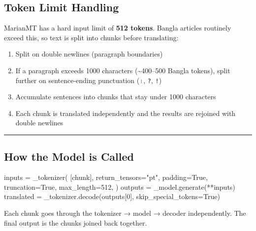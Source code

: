 \documentclass[
]{article}
\newenvironment{Shaded}{}{}
\newcommand{\DecValTok}[1]{\textcolor[rgb]{0.25,0.63,0.44}{#1}}
\newcommand{\NormalTok}[1]{#1}
\newcommand{\OperatorTok}[1]{\textcolor[rgb]{0.40,0.40,0.40}{#1}}
\newcommand{\StringTok}[1]{\textcolor[rgb]{0.25,0.44,0.63}{#1}}
\newcommand{\VariableTok}[1]{\textcolor[rgb]{0.10,0.09,0.49}{#1}}
\providecommand{\tightlist}{%
  \setlength{\itemsep}{0pt}\setlength{\parskip}{0pt}}
\begin{document}
\subsection{Token Limit Handling}\label{token-limit-handling}

MarianMT has a hard input limit of \textbf{512 tokens}. Bangla articles
routinely exceed this, so text is split into chunks before translating:

\begin{enumerate}
\def\labelenumi{\arabic{enumi}.}
\tightlist
\item
  Split on double newlines (paragraph boundaries)
\item
  If a paragraph exceeds 1000 characters (\textasciitilde400--500 Bangla
  tokens), split further on sentence-ending punctuation (\texttt{।},
  \texttt{?}, \texttt{!})
\item
  Accumulate sentences into chunks that stay under 1000 characters
\item
  Each chunk is translated independently and the results are rejoined
  with double newlines
\end{enumerate}

\begin{center}\rule{0.5\linewidth}{0.5pt}\end{center}

\subsection{How the Model is Called}\label{how-the-model-is-called}

\begin{Shaded}
\begin{Highlighting}[]
\NormalTok{inputs }\OperatorTok{=}\NormalTok{ \_tokenizer(}
\NormalTok{    [chunk],}
\NormalTok{    return\_tensors}\OperatorTok{=}\StringTok{"pt"}\NormalTok{,}
\NormalTok{    padding}\OperatorTok{=}\VariableTok{True}\NormalTok{,}
\NormalTok{    truncation}\OperatorTok{=}\VariableTok{True}\NormalTok{,}
\NormalTok{    max\_length}\OperatorTok{=}\DecValTok{512}\NormalTok{,}
\NormalTok{)}
\NormalTok{outputs }\OperatorTok{=}\NormalTok{ \_model.generate(}\OperatorTok{**}\NormalTok{inputs)}
\NormalTok{translated }\OperatorTok{=}\NormalTok{ \_tokenizer.decode(outputs[}\DecValTok{0}\NormalTok{], skip\_special\_tokens}\OperatorTok{=}\VariableTok{True}\NormalTok{)}
\end{Highlighting}
\end{Shaded}

Each chunk goes through the tokenizer → model → decoder independently.
The final output is the chunks joined back together.
\end{document}
